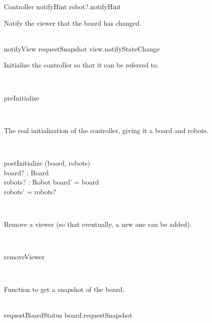 \documentclass[12pt]{article}
\begin{document}
\begin{class}{Controller}
notifyHint \sdef robot?.notifyHint \\
\begin{zpar}
Notify the viewer that the board has changed.
\end{zpar} \\
notifyView \sdef requestSnapshot \comp view.notifyStateChange
\znewpage
\begin{zpar}
Initialize the controller so that it can be referred to.
\end{zpar} \\
\begin{schema}{preInitialize}
\end{schema}\\
\begin{zpar}
The real initialization of the controller, giving it a board and robots.
\end{zpar} \\
\begin{schema}{postInitialize}
\Delta (board, robots) \\
board? : Board \\
robots? : \power Robot
\where
board' = board \\
robots' = robots?
\end{schema}\\
\begin{zpar}
Remove a viewer (so that eventually, a new one can be added).
\end{zpar} \\
\begin{schema}{removeViewer}
\end{schema}\\
\begin{zpar}
Function to get a snapshot of the board.
\end{zpar} \\
requestBoardStatus \sdef board.requestSnapshot
\end{class}
\end{document}
